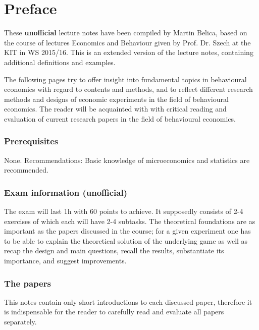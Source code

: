 

\chapter*{Preface}

These \textbf{unofficial} lecture notes have been compiled by Martin Belica, based on the course of lectures Economics and Behaviour given by Prof. Dr. Szech at the KIT in WS 2015/16. This is an extended version of the lecture notes, containing additional definitions and examples.

The following pages try to offer insight into fundamental topics in behavioural economics with regard to contents and methods, and to reflect different research methods and designs of economic experiments in the field of behavioural economics. The reader will be acquainted with with critical reading and evaluation of current research papers in the field of behavioural economics. \\

\subsection*{Prerequisites}
None. Recommendations: Basic knowledge of microeconomics and statistics are recommended. \\

\subsection*{Exam information  (unofficial)} 
The exam will last 1h with 60 points to achieve. It supposedly consists of 2-4 exercises of which each will have 2-4 subtasks. The theoretical foundations are as important as the papers discussed in the course; for a given experiment one has to be able to explain the theoretical solution of the underlying game as well as recap the design and main questions, recall the results, substantiate its importance, and suggest improvements. \\

\subsection*{The papers} 
This notes contain only short introductions to each discussed paper, therefore it is indispensable for the reader to carefully read and evaluate all papers separately.